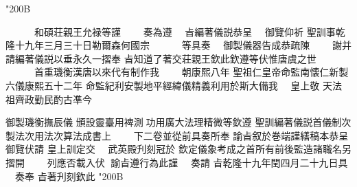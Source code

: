 \begin{正文}
\char"200B\relax
\par
　　　和碩荘親王允禄等謹
　　奏為遵
　㫖編著儀説恭呈
　御覽仰祈
聖訓事乾隆十九年三月三十日勒爾森何國宗
　　　等具奏
　御製儀器告成恭疏陳
　　謝并請編著儀説以垂永久一摺奉
㫖知道了著交荘親王欽此欽遵等伏惟唐虞之世
　　　首重璣衡漢唐以來代有制作我
　　朝康熙八年
聖祖仁皇帝命監南懐仁新製六儀康熙五十二年
命監紀利安製地平經緯儀精義利用於斯大備我
　皇上敬
天法
祖齊政勤民酌古凖今
\par
御製璣衡撫辰儀
頒設靈臺用禆測𠉀功用廣大法理精微等欽遵
聖訓編著儀説首儀制次製法次用法次算法成書上
　　下二卷並從前具奏所奉
諭㫖叙於巻端謹繕稿本恭呈
御覽伏請
皇上訓定交
　武英殿刋刻冠於
欽定儀象考成之首所有前後監造諸職名另摺開
　　列應否載入伏𠉀
諭㫖遵行為此謹
　奏請
㫖乾隆十九年閏四月二十九日具
　奏奉
㫖著刋刻欽此
\char"200B\relax
\par

\par\end{正文}\clearpage
